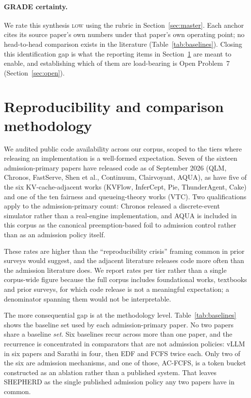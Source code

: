 \paragraph{GRADE certainty.} We rate this synthesis \textsc{low}
using the rubric in Section~\ref{sec:master}. Each anchor cites its
source paper's own numbers under that paper's own operating point;
no head-to-head comparison exists in the literature
(Table~\ref{tab:baselines}). Closing this identification gap is what
the reporting items in Section~\ref{sec:repro} are meant to enable, and
establishing which of them are load-bearing is Open Problem~7
(Section~\ref{sec:open}).

\section{Reproducibility and comparison methodology}
\label{sec:repro}

We audited public code availability across our corpus, scoped to the
tiers where releasing an implementation is a well-formed expectation.
Seven of the sixteen admission-primary papers have released code as of
September 2026 (QLM, Chronos, FastServe, Shen et al., Continuum,
Clairvoyant, AQUA), as have five of the six KV-cache-adjacent works
(KVFlow, InferCept, Pie, ThunderAgent, Cake) and one of the ten
fairness and queueing-theory works (VTC). Two qualifications apply to
the admission-primary count: Chronos released a discrete-event
simulator rather than a real-engine implementation, and AQUA is
included in this corpus as the canonical preemption-based foil to
admission control rather than as an admission policy itself.

These rates are higher than the ``reproducibility crisis'' framing
common in prior surveys would suggest, and the adjacent literature
releases code more often than the admission literature does. We report
rates per tier rather than a single corpus-wide figure because the full
corpus includes foundational works, textbooks and prior surveys, for
which code release is not a meaningful expectation; a denominator
spanning them would not be interpretable.

The more consequential gap is at the methodology level.
Table~\ref{tab:baselines} shows the baseline set used by each
admission-primary paper. No two papers share a baseline \emph{set}. Six baselines recur across
more than one paper, and the recurrence is concentrated in comparators
that are not admission policies: vLLM in six papers and Sarathi in
four, then EDF and FCFS twice each. Only two of the six are admission
mechanisms, and one of those, AC-FCFS, is a token bucket constructed
as an ablation rather than a published system. That leaves SHEPHERD as
the single published admission policy any two papers have in
common.

